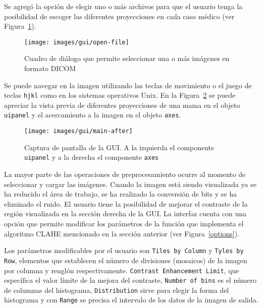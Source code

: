 Se agregó la opción de elegir uno o más archivos para que el usuario tenga la
posibilidad de escoger las diferentes proyecciones en cada caso médico (ver
Figura~\ref{fig:openfile}).

\begin{figure}[h]
  \begin{center}
    {\texttt{[image: images/gui/open-file]}}
  \end{center}
  \caption[GUI: Selección de archivos]
  {Cuadro de diálogo que permite seleccionar una o más imágenes en formato DICOM}
  \label{fig:openfile}
\end{figure}

Se puede navegar en la imagen utilizando las teclas de movimiento o el juego de
teclas \texttt{hjkl} como en los sistemas operativos Unix. En la
Figura~\ref{main:after} se puede apreciar la vista previa de diferentes
proyecciones de una mama en el objeto \texttt{uipanel} y el acercamiento a la
imagen en el objeto \texttt{axes}.

\begin{figure}[h]
  \begin{center}
    {\texttt{[image: images/gui/main-after]}}
  \end{center}

  \caption[GUI: Ventana principal 2]{Captura de pantalla de la GUI. A la
  izquierda el componente \texttt{uipanel} y a la derecha
  el componente \texttt{axes}}

  \label{main:after}
\end{figure}

La mayor parte de las operaciones de preprocesamiento ocurre al momento de
seleccionar y cargar las imágenes. Cuando la imagen está siendo visualizada ya
se ha reducido el área de trabajo, se ha realizado la conversión de bits y se
ha eliminado el ruido. El usuario tiene la posibilidad de mejorar el contraste
de la región visualizada en la sección derecha de la GUI. La interfaz cuenta
con una opción que permite modificar los parámetros de la función que
implementa el algoritmo CLAHE mencionado en la sección anterior (ver
Figura~\ref{options}).

Los parámetros modificables por el usuario son \texttt{Tiles by Column} y
\texttt{Tyles by Row}, elementos que establecen el número de divisiones
(mosaicos) de la imagen por columna y renglón respectivamente. \texttt{Contrast
Enhancement Limit}, que específica el valor límite de la mejora del contraste,
\texttt{Number of bins} es el número de columnas del histograma,
\texttt{Distribution} sirve para elegir la forma del histograma y con
\texttt{Range} se precisa el intervalo de los datos de la imagen de salida.

